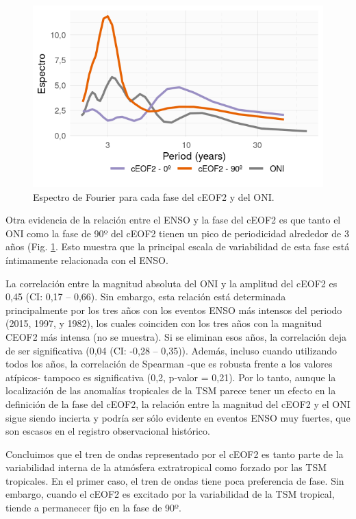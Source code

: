\documentclass[12pt,oneside,a4paper]{reedthesis}
\begin{document}
\begin{figure}

{\centering \includegraphics{figures/20-ceofs/fft-ceof-era5-1} 

}

\caption{Espectro de Fourier para cada fase del cEOF2 y del ONI.}\label{fig:fft-ceof-era5}
\end{figure}



Otra evidencia de la relación entre el ENSO y la fase del cEOF2 es que tanto el ONI como la fase de 90º del cEOF2 tienen un pico de periodicidad alrededor de 3 años (Fig. \ref{fig:fft-ceof-era5}.
Esto muestra que la principal escala de variabilidad de esta fase está íntimamente relacionada con el ENSO.

La correlación entre la magnitud absoluta del ONI y la amplitud del cEOF2 es 0,45 (CI: 0,17 -- 0,66).
Sin embargo, esta relación está determinada principalmente por los tres años con los eventos ENSO más intensos del periodo (2015, 1997, y 1982), los cuales coinciden con los tres años con la magnitud CEOF2 más intensa (no se muestra).
Si se eliminan esos años, la correlación deja de ser significativa (0,04 (CI: -0,28 -- 0,35)).
Además, incluso cuando utilizando todos los años, la correlación de Spearman -que es robusta frente a los valores atípicos- tampoco es significativa (0,2, p-valor = 0,21).
Por lo tanto, aunque la localización de las anomalías tropicales de la TSM parece tener un efecto en la definición de la fase del cEOF2, la relación entre la magnitud del cEOF2 y el ONI sigue siendo incierta y podría ser sólo evidente en eventos ENSO muy fuertes, que son escasos en el registro observacional histórico.

Concluimos que el tren de ondas representado por el cEOF2 es tanto parte de la variabilidad interna de la atmósfera extratropical como forzado por las TSM tropicales.
En el primer caso, el tren de ondas tiene poca preferencia de fase.
Sin embargo, cuando el cEOF2 es excitado por la variabilidad de la TSM tropical, tiende a permanecer fijo en la fase de 90º.
\end{document}
